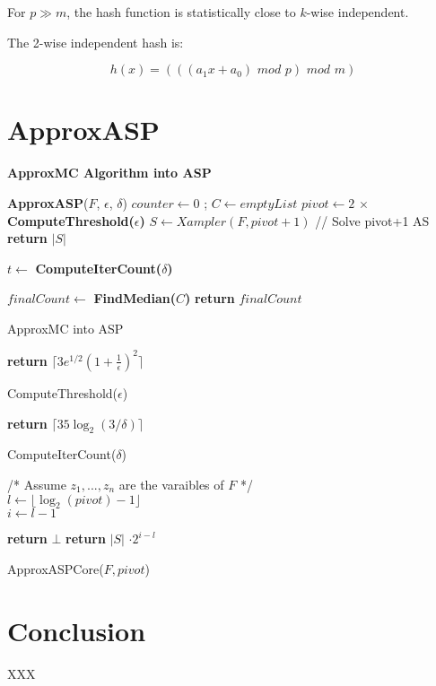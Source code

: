 \documentclass{article}
\begin{document}
For $p \gg	 m$, the hash function is statistically close to $k$-wise independent.

The 2-wise independent hash is: 

\[ h(x) = (((a_1 x + a_0) \,\, mod \,\, p) \,\, mod \,\, m ) \]

\section{ApproxASP} \label{approxasp}
\textbf{ApproxMC Algorithm into ASP}

\begin{algorithm}[h]
	\textbf{ApproxASP}($F$, $\epsilon$, $\delta$) \;
	\SetAlgoLined
	$counter \gets 0$ ; $C \gets emptyList$\;
	$pivot \gets  2 \, \times $ \textbf{ComputeThreshold($\epsilon$)} \;
	$S \gets Xampler(F, pivot + 1)$ // {Solve pivot+1 AS}  \;
	{ %
		\textbf{return} $|S|$ 
	} %
	{ %
		$t \gets $ \textbf{ComputeIterCount($\delta$)} 
		
	} %
	$finalCount \gets $ \textbf{FindMedian($C$)} \;
	\textbf{return} $finalCount$
	
	\caption{ApproxMC into ASP}
\end{algorithm}


\begin{algorithm}
	\textbf{return} $\lceil 3 e^{1/2} (1 + \frac{1}{\epsilon})^2 \rceil$
	\caption{ComputeThreshold($\epsilon$)}
\end{algorithm}

\begin{algorithm}
	\textbf{return} $\lceil 35 \log_2 (3/\delta) \rceil$
	\caption{ComputeIterCount($\delta$)}
\end{algorithm}

\begin{algorithm}
	/* Assume $z_1 , ..., z_n $ are the varaibles of $F$ */ \\
	$ l \gets \lfloor \log_2 (pivot) - 1 \rfloor$ \\
	$ i \gets l - 1$ \\
	
	
	{\textbf{return} $\bot$}
	{\textbf{return} $|S|$ $\cdot 2^{i-l}$}
	
	
	
	\caption{ApproxASPCore($F, pivot$)}
\end{algorithm}

\section{Conclusion} \label{sec:conclusion}
XXX



\end{document}
